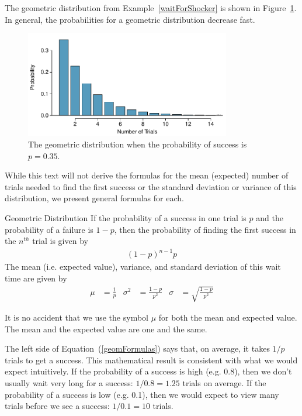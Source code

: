 The geometric distribution from Example~\ref{waitForShocker} is shown in Figure~\ref{geometricDist35}. In general, the probabilities for a geometric distribution decrease  fast.

\begin{figure}
\centering
\includegraphics[width=0.8\textwidth]{ch_distributions/figures/geometricDist35/geometricDist35}
\caption{The geometric distribution when the probability of success is $p=0.35$.}
\label{geometricDist35}
\end{figure}

While this text will not derive the formulas for the mean (expected) number of trials needed to find the first success or the standard deviation or variance of this distribution, we present general formulas for each.

\begin{onebox}{Geometric Distribution}
  If the probability of a success in one trial is $p$
  and the probability of a failure is $1-p$, then the
  probability of finding the first success in the
  $n^{th}$ trial is given by\vspace{-1.5mm}
  \begin{align*}
  (1-p)^{n-1}p
  \end{align*}
  The mean (i.e. expected value), variance,
  and standard deviation of this wait time are given by
  \begin{align}
  \mu &= \frac{1}{p}
      &\sigma^2&=\frac{1-p}{p^2}
      &\sigma &= \sqrt{\frac{1-p}{p^2}}
  \label{geomFormulas}
  \end{align}
\end{onebox}

It is no accident that we use the symbol $\mu$ for both the mean and expected value. The mean and the expected value are one and the same.

The left side of Equation~(\ref{geomFormulas}) says that, on average, it takes $1/p$ trials to get a success. This mathematical result is consistent with what we would expect intuitively. If the probability of a success is high (e.g. 0.8), then we don't usually wait very long for a success: $1/0.8 = 1.25$ trials on average. If the probability of a success is low (e.g. 0.1), then we would expect to view many trials before we see a success: $1/0.1 = 10$ trials.


